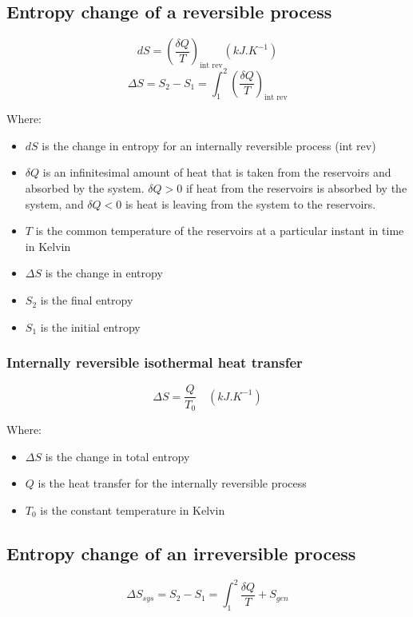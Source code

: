 \documentclass[11pt]{article}
\begin{document}
 \newpage

\subsection{Entropy change of a reversible process}
\label{sec:org7c0551c}
\[dS = \left( \frac{\delta Q}{T} \right)_{\text{int rev}} \left(\unit{kJ.K^{-1}} \right)\]
\[\Delta S = S_2 - S_1 = \int_1^2 \left(\frac{\delta Q}{T} \right)_{\text{int rev}}\]

Where:
\begin{itemize}
\item \(dS\) is the change in entropy for an internally reversible process (int rev)
\item \(\delta Q\) is an infinitesimal amount of heat that is taken from the reservoirs and absorbed by the system. \(\delta Q > 0\) if heat from the reservoirs is absorbed by the system, and \(\delta Q < 0\) is heat is leaving from the system to the reservoirs.
\item \(T\) is the common temperature of the reservoirs at a particular instant in time in Kelvin
\item \(\Delta S\) is the change in entropy
\item \(S_2\) is the final entropy
\item \(S_1\) is the initial entropy
\end{itemize}

\subsubsection{Internally reversible isothermal heat transfer}
\label{sec:orgae8d215}
\[\Delta S = \frac{Q}{T_0} \quad (\unit{kJ.K^{-1}})\]

Where:
\begin{itemize}
\item \(\Delta S\) is the change in total entropy
\item \(Q\) is the heat transfer for the internally reversible process
\item \(T_0\) is the constant temperature in Kelvin
\end{itemize}

 \newpage

\subsection{Entropy change of an irreversible process}
\label{sec:org793aa9a}
\[\Delta S_{sys} = S_2 - S_1 = \int_1^2 \frac{\delta Q}{T} + S_{gen}\]
\end{document}
